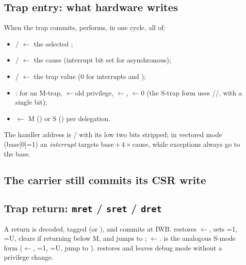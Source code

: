 \subsection{Trap entry: what hardware writes}
When the trap commits,  performs, in one cycle, all of:
\begin{itemize}[leftmargin=1.4em,itemsep=1pt]
\item {}/ $\leftarrow$ the selected ;
\item {}/ $\leftarrow$ the cause (interrupt bit set for
  asynchronous);
\item {}/ $\leftarrow$ the trap value (0 for interrupts and
  );
\item {}: for an M-trap, $\leftarrow$old privilege,
  $\leftarrow$, $\leftarrow$0 (the S-trap form uses
  //, with  a single bit);
\item {} $\leftarrow$ M () or S ()
  per delegation.
\end{itemize}
The handler address is / with its low two bits stripped;
in vectored mode (base[0]=1) an \emph{interrupt} targets base\,$+\,4\times$cause,
while exceptions always go to the base.

\subsection{The carrier still commits its CSR write}\label{sec:traps-carrier}

\subsection{Trap return: \texttt{mret} / \texttt{sret} / \texttt{dret}}
A return is decoded, tagged  (or ), and commits at
IWB.  restores $\leftarrow$, sets =1,
=U, clears  if returning below M, and jumps to ;
$\leftarrow$.  is the analogous S-mode form
($\leftarrow$, =1, =U, jump to ).
 restores  and leaves debug mode without a privilege change.

